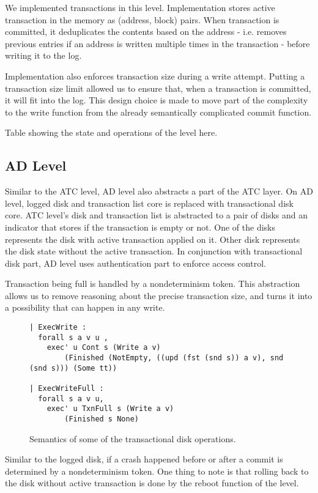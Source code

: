We implemented transactions in this level. Implementation stores active transaction in the memory as (address, block) pairs. When transaction is committed, it deduplicates the contents based on the address - i.e. removes previous entries if an address is written multiple times in the transaction - before writing it to the log.

Implementation also enforces transaction size during a write attempt. Putting a transaction size limit allowed us to ensure that, when a transaction is committed, it will fit into the log. This design choice is made to move part of the complexity to the write function from the already semantically complicated commit function.

{\color{red} Table showing the state and operations of the level here}.

\subsection{AD Level}
Similar to the ATC level, AD level also abstracts a part of the ATC layer. On AD level, logged disk and transaction list core is replaced with transactional disk core. ATC level's disk and transaction list is abstracted to a pair of disks and an indicator that stores if the transaction is empty or not. One of the disks represents the disk with active transaction applied on it. Other disk represents the disk state without the active transaction. In conjunction with transactional disk part, AD level uses authentication part to enforce access control.

Transaction being full is handled by a nondeterminism token. This abstraction allows us to remove reasoning about the precise transaction size, and turns it into a possibility that can happen in any write.

\begin{figure}[ht]
    \centering
\begin{verbatim}
| ExecWrite :
  forall s a v u ,
    exec' u Cont s (Write a v) 
        (Finished (NotEmpty, ((upd (fst (snd s)) a v), snd (snd s))) (Some tt))

| ExecWriteFull :
  forall s a v u,
    exec' u TxnFull s (Write a v) 
        (Finished s None)
\end{verbatim}
    \caption{Semantics of some of the transactional disk operations.}
    \label{fig:TD_Semantics}
\end{figure}

Similar to the logged disk, if a crash happened before or after a commit is determined by a nondeterminism token. One thing to note is that rolling back to the disk without active transaction is done by the reboot function of the level.

